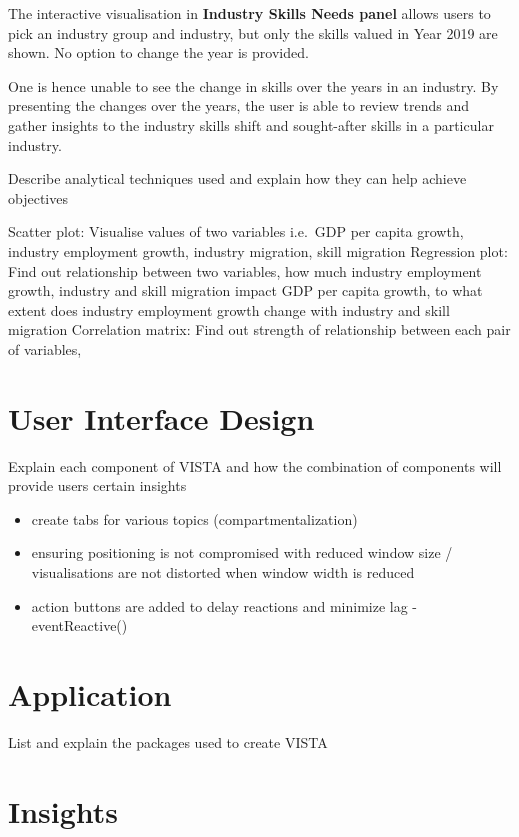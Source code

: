 \documentclass{acm_proc_article-sp}
\providecommand{\tightlist}{%
  \setlength{\itemsep}{0pt}\setlength{\parskip}{0pt}}
\begin{document}
The interactive visualisation in \textbf{Industry Skills Needs panel}
allows users to pick an industry group and industry, but only the skills
valued in Year 2019 are shown. No option to change the year is provided.

One is hence unable to see the change in skills over the years in an
industry. By presenting the changes over the years, the user is able to
review trends and gather insights to the industry skills shift and
sought-after skills in a particular industry.

Describe analytical techniques used and explain how they can help
achieve objectives

Scatter plot: Visualise values of two variables i.e.~GDP per capita
growth, industry employment growth, industry migration, skill migration
Regression plot: Find out relationship between two variables, how much
industry employment growth, industry and skill migration impact GDP per
capita growth, to what extent does industry employment growth change
with industry and skill migration Correlation matrix: Find out strength
of relationship between each pair of variables,

\hypertarget{user-interface-design}{%
\section{User Interface Design}\label{user-interface-design}}

Explain each component of VISTA and how the combination of components
will provide users certain insights

\begin{itemize}
\tightlist
\item
  create tabs for various topics (compartmentalization)
\item
  ensuring positioning is not compromised with reduced window size /
  visualisations are not distorted when window width is reduced
\item
  action buttons are added to delay reactions and minimize lag -
  eventReactive()
\end{itemize}

\hypertarget{application}{%
\section{Application}\label{application}}

List and explain the packages used to create VISTA

\hypertarget{insights}{%
\section{Insights}\label{insights}}
\end{document}
